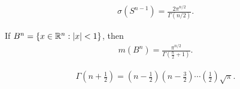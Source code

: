 \begin{proposition}
    \begin{align}
        \sigma(S^{n-1}) = \frac{2 \pi^{n/2}}{\Gamma(n/2)}.
    \end{align}
\end{proposition}

\begin{corollary}
    If $B^n = \{x \in \mathbb{R}^n: |x| < 1 \}$, then 
    \begin{align}
        m(B^n) = \frac{\pi^{n/2}}{\Gamma(\frac{n}{2}+1)}.
    \end{align}
\end{corollary}

\begin{proposition}
    \begin{align}
        \Gamma(n + \frac{1}{2}) = (n - \frac{1}{2}) (n - \frac{3}{2}) \cdots (\frac{1}{2}) \sqrt{\pi}.
    \end{align}
\end{proposition}